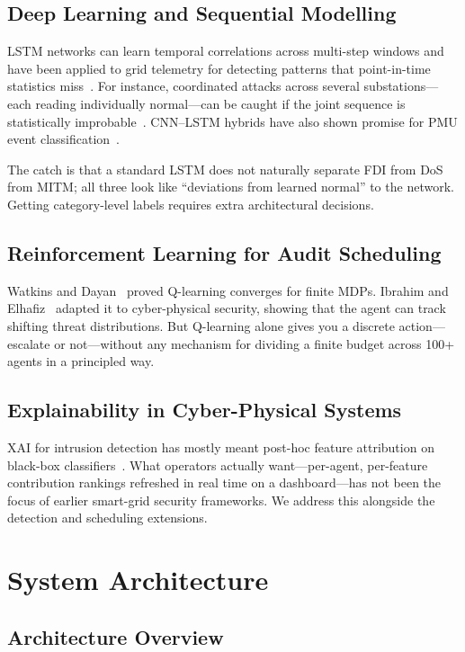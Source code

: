 \documentclass[conference]{IEEEtran}
\begin{document}
\subsection{Deep Learning and Sequential Modelling}

LSTM networks can learn temporal correlations across multi-step windows and have been applied to grid telemetry for detecting patterns that point-in-time statistics miss~\cite{b11}. For instance, coordinated attacks across several substations---each reading individually normal---can be caught if the joint sequence is statistically improbable~\cite{b12}. CNN--LSTM hybrids have also shown promise for PMU event classification~\cite{b13}.

The catch is that a standard LSTM does not naturally separate FDI from DoS from MITM; all three look like ``deviations from learned normal'' to the network. Getting category-level labels requires extra architectural decisions.

\subsection{Reinforcement Learning for Audit Scheduling}

Watkins and Dayan~\cite{b14} proved Q-learning converges for finite MDPs. Ibrahim and Elhafiz~\cite{b7} adapted it to cyber-physical security, showing that the agent can track shifting threat distributions. But Q-learning alone gives you a discrete action---escalate or not---without any mechanism for dividing a finite budget across 100+ agents in a principled way.

\subsection{Explainability in Cyber-Physical Systems}

XAI for intrusion detection has mostly meant post-hoc feature attribution on black-box classifiers~\cite{b15}. What operators actually want---per-agent, per-feature contribution rankings refreshed in real time on a dashboard---has not been the focus of earlier smart-grid security frameworks. We address this alongside the detection and scheduling extensions.

\section{System Architecture}

\subsection{Architecture Overview}
\end{document}
